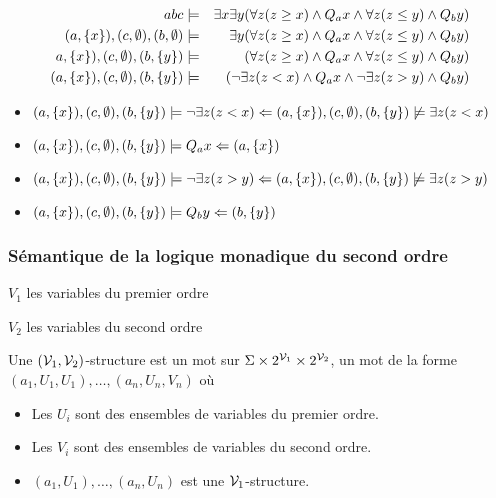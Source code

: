 \begin{exemple}
	\begin{eqnarray*}
		abc  &\models&\exists x \exists y (\forall z (z \geq x) \land Q_a x \land \forall z (z \leq y) \land Q_b y)\\
		(a, \left\{x\right\}), (c, \emptyset), (b, \emptyset)  &\models &\exists y (\forall z (z \geq x) \land Q_a x \land \forall z (z \leq y) \land Q_b y)\\
		a, \left\{x\right\}), (c, \emptyset), (b, \left\{y\right\}) & \models& (\forall z (z \geq x) \land Q_a x \land \forall z (z \leq y) \land Q_b y)\\
		(a, \left\{x\right\}), (c, \emptyset), (b, \left\{y\right\})  &\models& (\lnot \exists z (z < x) \land Q_a x \land \lnot \exists z (z > y) \land Q_b y)\\
	\end{eqnarray*}
	\begin{itemize}
		\item $(a, \left\{x\right\}), (c, \emptyset), (b, \left\{y\right\})  \models \lnot \exists z (z < x) \Leftarrow  (a, \left\{x\right\}), (c, \emptyset), (b, \left\{y\right\})  \not\models \exists z (z < x) $
		\item $(a, \left\{x\right\}), (c, \emptyset), (b, \left\{y\right\})  \models Q_a x \Leftarrow  (a, \left\{x\right\}) $
		\item $(a, \left\{x\right\}), (c, \emptyset), (b, \left\{y\right\})  \models  \lnot \exists z (z > y) \Leftarrow  (a, \left\{x\right\}), (c, \emptyset), (b, \left\{y\right\})  \not\models \exists z (z > y) $
		\item $(a, \left\{x\right\}), (c, \emptyset), (b, \left\{y\right\})  \models  Q_b y \Leftarrow  (b, \left\{y\right\})$
	\end{itemize}

\end{exemple}


\subsubsection{Sémantique de la logique monadique du second ordre}


$V_1$ les variables du premier ordre

$V_2$ les variables du second ordre


\begin{definition}
	Une $(\mathcal{V}_1,\mathcal{V}_2)$-structure est un mot sur $\Sigma \times 2^{\mathcal{V}_1} \times  2^{\mathcal{V}_2}$, \cad un mot de la forme
	$(a_1,U_1,U_1), \ldots, (a_n,U_n,V_n)$ où
	\begin{itemize}
		\item Les $U_i$ sont des ensembles de variables du premier ordre.
		\item Les $V_i$ sont des ensembles de variables du second ordre.
		\item $(a_1,U_1), \ldots, (a_n,U_n)$ est une $\mathcal{V}_1$-structure.
	\end{itemize}
\end{definition}

